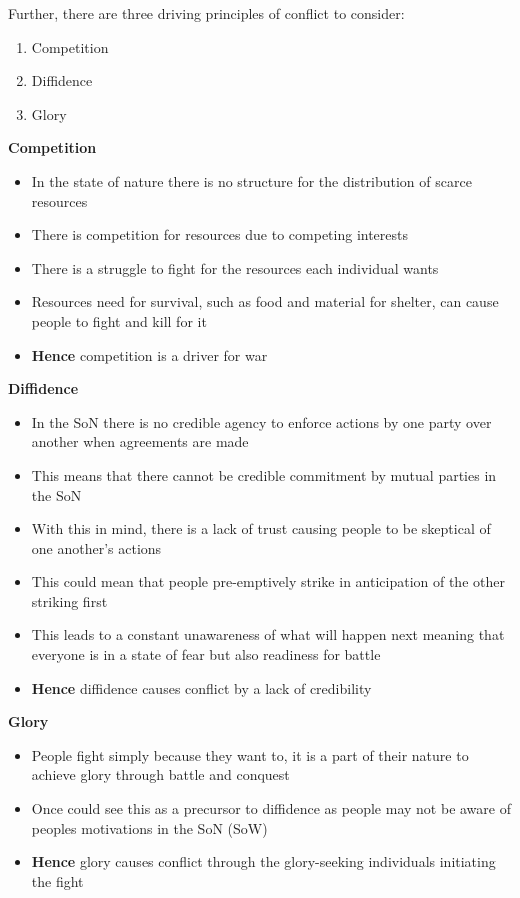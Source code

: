 \documentclass[12pt, letterpaper]{article}
\begin{document}
Further, there are three driving principles of conflict to consider:
\begin{enumerate}
	\item Competition
	\item Diffidence
	\item Glory
\end{enumerate}
\textbf{Competition}
\begin{itemize}
	\item In the state of nature there is no structure for the distribution of scarce resources
	\item There is competition for resources due to competing interests
	\item There is a struggle to fight for the resources each individual wants
	\item Resources need for survival, such as food and material for shelter, can cause people to fight and kill for it
	\item \textbf{Hence} competition is a driver for war
\end{itemize}
\textbf{Diffidence}
\begin{itemize}
	\item In the SoN there is no credible agency to enforce actions by one party over another when agreements are made
	\item This means that there cannot be credible commitment by mutual parties in the SoN
	\item With this in mind, there is a lack of trust causing people to be skeptical of one another's actions
	\item This could mean that people pre-emptively strike in anticipation of the other striking first
	\item This leads to a constant unawareness of what will happen next meaning that everyone is in a state of fear but also readiness for battle
	\item \textbf{Hence} diffidence causes conflict by a lack of credibility
\end{itemize}
\textbf{Glory}
\begin{itemize}
	\item People fight simply because they want to, it is a part of their nature to achieve glory through battle and conquest
	\item Once could see this as a precursor to diffidence as people may not be aware of peoples motivations in the SoN (SoW)
	\item \textbf{Hence} glory causes conflict through the glory-seeking individuals initiating the fight
\end{itemize}
\end{document}
